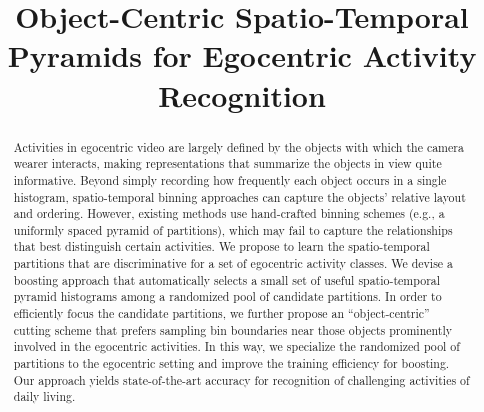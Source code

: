 \documentclass{bmvc2k}
\title{Object-Centric Spatio-Temporal Pyramids for Egocentric Activity Recognition}
\begin{document}
\maketitle

\begin{abstract}
Activities in egocentric video are largely defined by the objects with which the camera wearer interacts, making representations that summarize the objects in view quite informative.  Beyond simply recording how frequently each object occurs in a single histogram, spatio-temporal binning approaches can capture the objects' relative layout and ordering.  However, existing methods use hand-crafted binning schemes (e.g., a uniformly spaced pyramid of partitions), which may fail to capture the relationships that best distinguish certain activities.  We propose to learn the spatio-temporal partitions that are discriminative for a set of egocentric activity classes.  We devise a boosting approach that automatically selects a small set of useful spatio-temporal pyramid histograms among a randomized pool of candidate partitions.  In order to efficiently focus the candidate partitions, we further propose an ``object-centric'' cutting scheme that prefers sampling bin boundaries near those objects prominently involved in the egocentric activities. In this way, we specialize the randomized pool of partitions to the egocentric setting and improve the training efficiency for boosting.  Our approach yields state-of-the-art accuracy for recognition of challenging activities of daily living.
\end{abstract}

\end{document}
